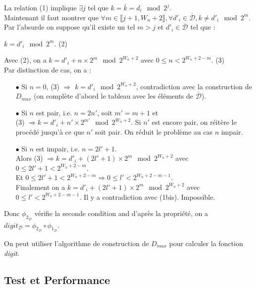 \documentclass[12pt, a4paper]{memoir}
\begin{document}
\begin{Preuve}
  La relation (1) implique $\exists j$ tel que $k = \bar{k} = d_i \mod 2^j$. \\
  Maintenant il faut montrer que $\forall m \in \llbracket j+1,W_n+2 \rrbracket, \forall d'_i \in \overline{\mathcal{D}}, k \neq d'_i \mod 2^m$. \\
  Par l'absurde on suppose qu'il existe un tel $m > j$ et $d'_i \in \overline{\mathcal{D}}$ tel que :
  \begin{center} $k = d'_i \mod 2^m$. (2) \end{center}
  Avec (2), on a $k = d'_i + n \times 2^m \mod 2^{W_n+2}$ avec $0 \leq n < 2^{W_n+2-m}$. (3) \\
  Par distinction de cas, on a :
  \begin{itemize}
   \item[$\bullet$] Si $n = 0$, (3) $\Rightarrow$ $k = d'_i \mod 2^{W_n+2}$, contradiction avec la construction de $D_{max}$ (on complète d'abord le tableau avec les éléments de $\overline{\mathcal{D}}$).
   \item[$\bullet$] Si $n$ est pair, i.e. $n = 2n'$, soit $m'=m+1$ et \\
   (3) $\Rightarrow k = d'_i + n' \times 2^{m'} \mod 2^{W_n+2}$. Si $n'$ est encore pair, on réitère le procédé jusqu'à ce que $n'$ soit pair.
   On réduit le problème au cas $n$ impair.
   \item[$\bullet$] Si $n$ est impair, i.e. $n = 2l'+1$. \\
   Alors (3) $\Rightarrow k = d'_i + (2l'+1) \times 2^m \mod 2^{W_n+2}$ avec $0 \leq 2l'+1 < 2^{W_n+2-m}$. \\
   Et $0 \leq 2l'+1 < 2^{W_n+2-m} \Rightarrow 0 \leq l' < 2^{W_n+2-m-1}$. \\
   Finalement on a $k = d'_i + (2l'+1) \times 2^m \mod 2^{W_n+2}$ avec $0 \leq l' < 2^{W_n+2-m-1}$.
   Il y a contradiction avec (1bis). Impossible.
   \end{itemize}
  
  Donc $\phi_{2_\mathcal{D}}$ vérifie la seconde condition and d'après la propriété,
 on a $digit_{\mathcal{D}} = \phi_{2_\mathcal{D}} \circ \phi_{1_\mathcal{D}}$.
\end{Preuve}

\begin{Corollaire}
 On peut utiliser l'algorithme de construction de \emph{$D_{max}$} pour calculer la fonction \emph{digit}.
\end{Corollaire}

\subsection{Test et Performance}
\end{document}
